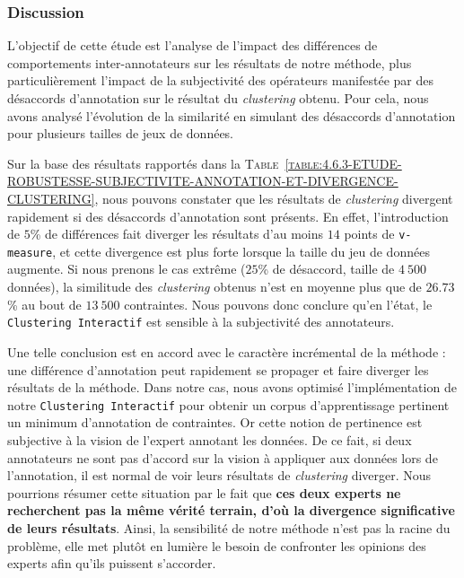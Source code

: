 		\subsubsection{Discussion}
		
			L'objectif de cette étude est l'analyse de l'impact des différences de comportements inter-annotateurs sur les résultats de notre méthode, plus particulièrement l'impact de la subjectivité des opérateurs manifestée par des désaccords d'annotation sur le résultat du \textit{clustering} obtenu.
			Pour cela, nous avons analysé l'évolution de la similarité en simulant des désaccords d'annotation pour plusieurs tailles de jeux de données.
			
			Sur la base des résultats rapportés dans la \textsc{Table~\ref{table:4.6.3-ETUDE-ROBUSTESSE-SUBJECTIVITE-ANNOTATION-ET-DIVERGENCE-CLUSTERING}}, nous pouvons constater que les résultats de \textit{clustering} divergent rapidement si des désaccords d'annotation sont présents.
			En effet, l'introduction de $5$\% de différences fait diverger les résultats d'au moins $14$ points de \texttt{v-measure}, et cette divergence est plus forte lorsque la taille du jeu de données augmente.
			Si nous prenons le cas extrême ($25$\% de désaccord, taille de $4~500$ données), la similitude des \textit{clustering} obtenus n'est en moyenne plus que de $26.73$\% au bout de $13~500$ contraintes.
			Nous pouvons donc conclure qu'en l'état, le \texttt{Clustering Interactif} est sensible à la subjectivité des annotateurs.
			
			Une telle conclusion est en accord avec le caractère incrémental de la méthode : une différence d'annotation peut rapidement se propager et faire diverger les résultats de la méthode.
			Dans notre cas, nous avons optimisé l'implémentation de notre \texttt{Clustering Interactif} pour obtenir un corpus d'apprentissage pertinent un minimum d'annotation de contraintes.
			Or cette notion de pertinence est subjective à la vision de l'expert annotant les données.
			De ce fait, si deux annotateurs ne sont pas d'accord sur la vision à appliquer aux données lors de l'annotation, il est normal de voir leurs résultats de \textit{clustering} diverger.
			Nous pourrions résumer cette situation par le fait que \textbf{ces deux experts ne recherchent pas la même vérité terrain, d'où la divergence significative de leurs résultats}.
			Ainsi, la sensibilité de notre méthode n'est pas la racine du problème, elle met plutôt en lumière le besoin de confronter les opinions des experts afin qu'ils puissent s'accorder.
			
